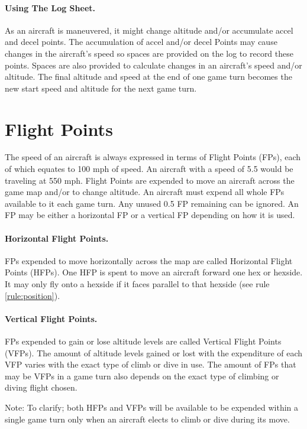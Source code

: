 \paragraph{Using The Log Sheet.} 
As an aircraft is maneuvered, it might change altitude and/or accumulate accel and decel points. The accumulation of accel and/or decel Points may cause changes in the aircraft's speed so spaces are provided on the log to record these points. Spaces are also provided to calculate changes in an aircraft's speed and/or altitude. The final altitude and speed at the end of one game turn becomes the new start speed and altitude for the next game turn.

\section{Flight Points}
\label{rule:flight-points}

The speed of an aircraft is always expressed in terms of Flight Points (FPs), each of which equates to 100 mph of speed. An aircraft with a speed of 5.5 would be traveling at 550 mph. Flight Points are expended to move an aircraft across the game map and/or to change altitude.  An aircraft must expend all whole FPs available to it each game turn. Any unused 0.5 FP remaining can be ignored. An FP may be either a horizontal FP or a vertical FP depending on how it is used.

\paragraph{Horizontal Flight Points.} 
FPs expended to move horizontally across the map are called Horizontal Flight Points (HFPs). One HFP is spent to move an aircraft forward one hex or hexside. It may only fly onto a hexside if it faces parallel to that hexside (see rule \ref{rule:position}).

\paragraph{Vertical Flight Points.} 
FPs expended to gain or lose altitude levels are called Vertical Flight Points (VFPs). The amount of altitude levels gained or lost with the expenditure of each VFP varies with the exact type of climb or dive in use.  The amount of FPs that may be VFPs in a game turn also depends on the exact type of climbing or diving flight chosen.

Note: To clarify; both HFPs and VFPs will be available to be expended within a single game turn only when an aircraft elects to climb or dive during its move.

